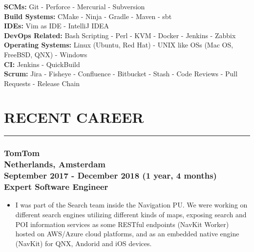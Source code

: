 \documentclass[10pt,a4paper]{article}
\begin{document}
\textbullet \hspace{0.1cm}\textbf{SCMs:} Git - Perforce - Mercurial - Subversion \\
\textbullet \hspace{0.1cm}\textbf{Build Systems:} CMake - Ninja - Gradle - Maven - sbt \\
\textbullet \hspace{0.1cm}\textbf{IDEs:} Vim as IDE - IntelliJ IDEA \\
\textbullet \hspace{0.1cm}\textbf{DevOps Related:} Bash Scripting - Perl - KVM - Docker - Jenkins - Zabbix \\
\textbullet \hspace{0.1cm}\textbf{Operating Systems:} Linux (Ubuntu, Red Hat) - UNIX like OSs (Mac OS, FreeBSD, QNX) - Windows \\
\textbullet \hspace{0.1cm}\textbf{CI:} Jenkins - QuickBuild \\
\textbullet \hspace{0.1cm}\textbf{Scrum:} Jira - Fisheye - Confluence - Bitbucket - Stash - Code Reviews - Pull Requests - Release Chain

\section{RECENT CAREER}
\noindent \rule {4.3cm}{0.4pt}
\subsubsection{{ \textbullet \hspace{0.1cm} \large TomTom} \\
\textnormal{Netherlands, Amsterdam} \\
\textnormal{September 2017 - December 2018 (1 year, 4 months)} \\
{Expert Software Engineer}}
  \setlength{\leftskip}{0.5cm}
  \setlength{\rightskip}{1cm}
  \begin{itemize}
    \setlength{\rightskip}{1cm}
    \setlength\itemsep{0em}
    \item I was part of the Search team inside the Navigation PU. We were working on different search engines utilizing different kinds of maps, exposing search and POI information services as some RESTful endpoints (NavKit Worker) hosted on AWS/Azure cloud platforms, and as an embedded native engine (NavKit) for QNX, Andorid and iOS devices.
  \end{itemize}
  \setlength{\leftskip}{0pt}
  \setlength{\rightskip}{0cm}
\end{document}
